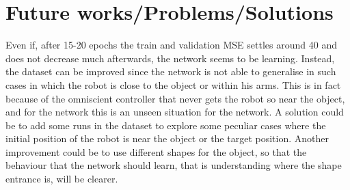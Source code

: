 \section{Future works/Problems/Solutions}
Even if, after 15-20 epochs the train and validation MSE settles around 40 and does not decrease much afterwards, the 
network seems to be learning. Instead, the dataset can be improved since the network is not able to generalise in such 
cases in which the robot is close to the object or within his arms. This is in fact because of the omniscient 
controller that never gets the robot so near the object, and for the network this is an unseen situation for the 
network.
A solution could be to add some runs in the dataset to explore some peculiar cases where the initial position of the 
robot is near the object or the target position.
Another improvement could be to use different shapes for the object, so that the behaviour that the network should 
learn, that is understanding where the shape entrance is, will be clearer.
%
%
%
%
%
%
%
